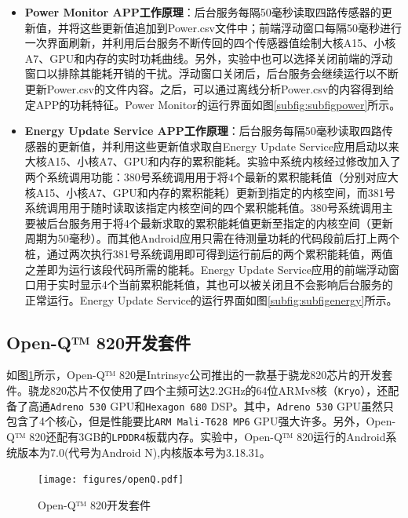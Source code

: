 \begin{itemize}
  \item \textbf{Power Monitor APP工作原理}：后台服务每隔50毫秒读取四路传感器的更新值，并将这些更新值追加到Power.csv文件中；前端浮动窗口每隔50毫秒进行一次界面刷新，并利用后台服务不断传回的四个传感器值绘制大核A15、小核A7、GPU和内存的实时功耗曲线。另外，实验中也可以选择关闭前端的浮动窗口以排除其能耗开销的干扰。浮动窗口关闭后，后台服务会继续运行以不断更新Power.csv的文件内容。之后，可以通过离线分析Power.csv的内容得到给定APP的功耗特征。Power Monitor的运行界面如图\ref{subfig:subfigpower}所示。
  \item \textbf{Energy Update Service APP工作原理}：后台服务每隔50毫秒读取四路传感器的更新值，并利用这些更新值求取自Energy Update Service应用启动以来大核A15、小核A7、GPU和内存的累积能耗。实验中系统内核经过修改加入了两个系统调用功能：380号系统调用用于将4个最新的累积能耗值（分别对应大核A15、小核A7、GPU和内存的累积能耗）更新到指定的内核空间，而381号系统调用用于随时读取该指定内核空间的四个累积能耗值。380号系统调用主要被后台服务用于将4个最新求取的累积能耗值更新至指定的内核空间（更新周期为50毫秒）。而其他Android应用只需在待测量功耗的代码段前后打上两个桩，通过两次执行381号系统调用即可得到运行前后的两个累积能耗值，两值之差即为运行该段代码所需的能耗。Energy Update Service应用的前端浮动窗口用于实时显示4个当前累积能耗值，其也可以被关闭且不会影响后台服务的正常运行。Energy Update Service的运行界面如图\ref{subfig:subfigenergy}所示。
\end{itemize}

\subsection{Open-Q™ 820开发套件}
\label{chapter:chapter2-5-2}

如图\ref{figure:figureopenQ}所示，Open-Q™ 820是Intrinsyc公司推出的一款基于骁龙820芯片的开发套件。骁龙820芯片不仅使用了四个主频可达2.2GHz的64位ARMv8核（\texttt{Kryo}），还配备了高通\texttt{Adreno 530} GPU和\texttt{Hexagon 680} DSP。其中，\texttt{Adreno 530} GPU虽然只包含了4个核心，但是性能要比\texttt{ARM Mali-T628 MP6} GPU强大许多。另外，Open-Q™ 820还配有3GB的\texttt{LPDDR4}板载内存。实验中，Open-Q™ 820运行的Android系统版本为7.0(代号为Android N),内核版本号为3.18.31。

\begin{figure}[htbp]
    \begin{center}
    \texttt{[image: figures/openQ.pdf]}
    \end{center}
    \caption{Open-Q™ 820开发套件}\label{figure:figureopenQ}
\end{figure}


